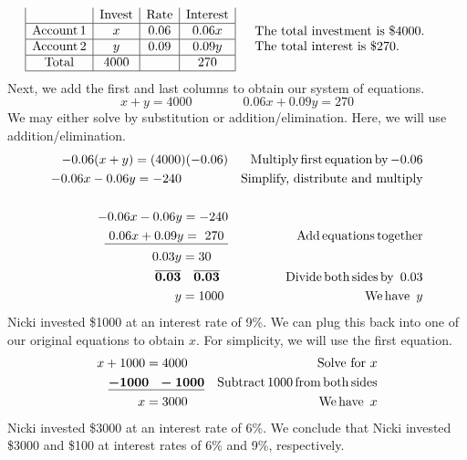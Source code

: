 \begin{example}
\begin{eqnarray*}
\begin{array}{|c|c|c|c|}
      & \tmop{Invest} & \tmop{Rate} & \tmop{Interest}\\
      \hline
      \tmop{Account} 1 & x & 0.06 & 0.06 x\\
      \hline
      \tmop{Account} 2 & y & 0.09 & 0.09 y\\
      \hline
      \tmop{Total} & 4000 &  & 270\\
      \hline
    \end{array} &  & \begin{array}{p{0.425\textwidth}}
      \tmop{The~total} \tmop{investment} \tmop{is} \$4000.\\
      \tmop{The~total} \tmop{interest} \tmop{is} \$270.
    \end{array}
		\end{eqnarray*}
		Next, we add the first and last columns to obtain our system of equations.
		$$x + y = 4000\qquad\qquad 0.06 x + 0.09 y = 270$$
		We may either solve by substitution or addition/elimination.  Here, we will use addition/elimination.
	\begin{eqnarray*}
    - 0.06 (x + y) = (4000) (- 0.06) &  & \operatorname{Multiply} \operatorname{first} \operatorname{equation} \operatorname{by} - 0.06\\
    - 0.06 x - 0.06 y = - 240~~~~~~~~~~~ &  & \text{Simplify,~distribute~and~multiply}\\
    &  & \\
    - 0.06 x - 0.06 y = - 240 &  & \\
    \underline{~0.06 x + 0.09 y = ~270~} &  & \operatorname{Add} \operatorname{equations} \operatorname{together}\\
    0.03 y = 30~~~~ &  & \\
    \boldsymbol{\overline{0.03} ~~~ \overline{0.03}}~~ &  & \operatorname{Divide} \operatorname{both} \operatorname{sides} \operatorname{by~} 0.03\\
    y = 1000~ &  & \operatorname{We} \operatorname{have~} y
	\end{eqnarray*}
	Nicki invested \$1000 at an interest rate of 9\%.  We can plug this back into one of our original equations to obtain $x$.  For simplicity, we will use the first equation.
	\begin{eqnarray*}
    x + 1000 = 4000~~~~ &  & \text{Solve~for~} x\\
    \boldsymbol{\underline{- 1000 ~~- 1000}} &  & \operatorname{Subtract} 1000 \operatorname{from} \operatorname{both}
    \operatorname{sides}\\
    x = 3000~~~~ &  & \operatorname{We} \operatorname{have~} x
	\end{eqnarray*}
	Nicki invested \$3000  at an interest rate of 6\%.  We conclude that Nicki invested \$3000 and \$100 at interest rates of 6\% and 9\%, respectively.
\end{example}
